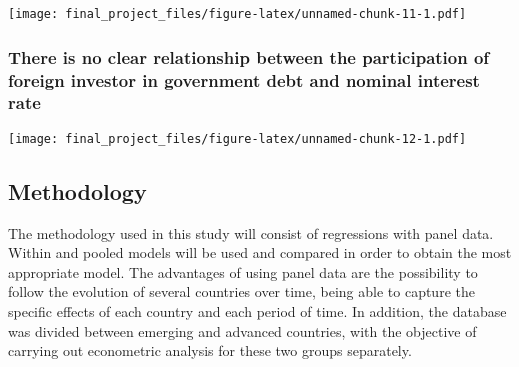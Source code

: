 \documentclass[
]{article}
\newenvironment{Shaded}{\begin{snugshade}}{\end{snugshade}}
\newcommand{\CommentTok}[1]{\textcolor[rgb]{0.56,0.35,0.01}{\textit{#1}}}
\begin{document}
\texttt{[image: final\_project\_files/figure-latex/unnamed-chunk-11-1.pdf]}

\hypertarget{there-is-no-clear-relationship-between-the-participation-of-foreign-investor-in-government-debt-and-nominal-interest-rate}{%
\subsubsection{There is no clear relationship between the participation
of foreign investor in government debt and nominal interest
rate}\label{there-is-no-clear-relationship-between-the-participation-of-foreign-investor-in-government-debt-and-nominal-interest-rate}}

\texttt{[image: final\_project\_files/figure-latex/unnamed-chunk-12-1.pdf]}

\begin{Shaded}
\end{Shaded}

\hypertarget{methodology}{%
\subsection{Methodology}\label{methodology}}

The methodology used in this study will consist of regressions with
panel data. Within and pooled models will be used and compared in order
to obtain the most appropriate model. The advantages of using panel data
are the possibility to follow the evolution of several countries over
time, being able to capture the specific effects of each country and
each period of time. In addition, the database was divided between
emerging and advanced countries, with the objective of carrying out
econometric analysis for these two groups separately.
\end{document}
